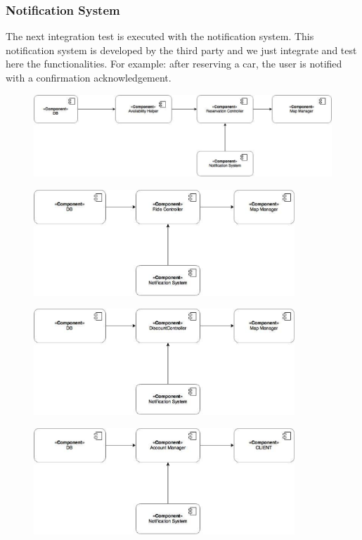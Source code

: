 \subsubsection*{Notification System}
The next integration test is executed with the notification system. This notification system is developed by the third party and we just integrate and test here the functionalities. For example: after reserving a car, the user is notified with a confirmation acknowledgement.

\begin{figure}[h]
	\centering
	\includegraphics[width=\linewidth,keepaspectratio]{figures/itp4.eps}
	\label{fig:itp4}
\end{figure}

\begin{figure}[h]
	\centering
	\includegraphics[height=4cm,keepaspectratio]{figures/itp5.eps}
	\label{fig:itp5}
\end{figure}

\begin{figure}[h]
	\centering
	\includegraphics[height=4cm,keepaspectratio]{figures/itp7.eps}
	\label{fig:itp7}
\end{figure}

\newpage
\begin{figure}[h]
	\centering
	\includegraphics[height=4cm,keepaspectratio]{figures/itp8.eps}
	\label{fig:itp8}
\end{figure}


